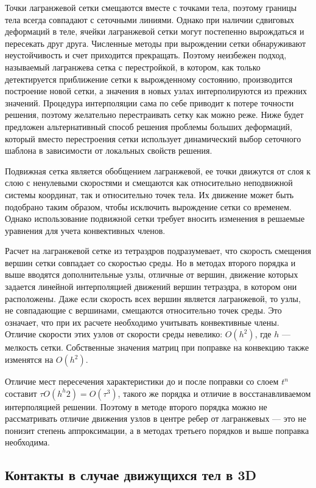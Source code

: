 Точки лагранжевой сетки смещаются вместе с точками тела, поэтому границы тела всегда совпадают с сеточными линиями. Однако при наличии сдвиговых деформаций в теле, ячейки лагранжевой сетки могут постепенно вырождаться и пересекать друг друга. Численные методы при вырождении сетки обнаруживают неустойчивость и счет приходится прекращать. Поэтому неизбежен подход, называемый лагранжева сетка с перестройкой, в котором, как только детектируется приближение сетки к вырожденному состоянию, производится построение новой сетки, а значения в новых узлах интерполируются из прежних значений. Процедура интерполяции сама по себе приводит к потере точности решения, поэтому желательно перестраивать сетку как можно реже. Ниже будет предложен альтернативный способ решения проблемы больших деформаций, который вместо перестроения сетки использует динамический выбор сеточного шаблона в зависимости от локальных свойств решения.

Подвижная сетка является обобщением лагранжевой, ее точки движутся от слоя к слою с ненулевыми скоростями и смещаются как относительно неподвижной системы координат, так и относительно точек тела. Их движение может быть подобрано таким образом, чтобы исключить вырождение сетки со временем. Однако использование подвижной сетки требует вносить изменения в решаемые уравнения для учета конвективных членов.

Расчет на лагранжевой сетке из тетраэдров подразумевает, что скорость смещения вершин сетки совпадает со скоростью среды. Но в методах второго порядка и выше вводятся дополнительные узлы, отличные от вершин, движение которых задается линейной интерполяцией движений вершин тетраэдра, в котором они расположены. Даже если скорость всех вершин является лагранжевой, то узлы, не совпадающие с вершинами, смещаются относительно точек среды. Это означает, что при их расчете необходимо учитывать конвективные члены. Отличие скорости этих узлов от скорости среды невелико: $O(h^2)$, где $h$ — мелкость сетки. Собственные значения матриц при поправке на конвекцию также изменятся на $O(h^2)$.

Отличие мест пересечения характеристики до и после поправки со слоем $t^n$ составит $\tau O(h^h2) = O(\tau^3)$, такого же порядка и отличие в восстанавливаемом интерполяцией решении. Поэтому в методе второго порядка можно не рассматривать отличие движения узлов в центре ребер от лагранжевых — это не понизит степень аппроксимации, а в методах третьего порядков и выше поправка необходима.


\subsection{Контакты в случае движущихся тел в 3D}

